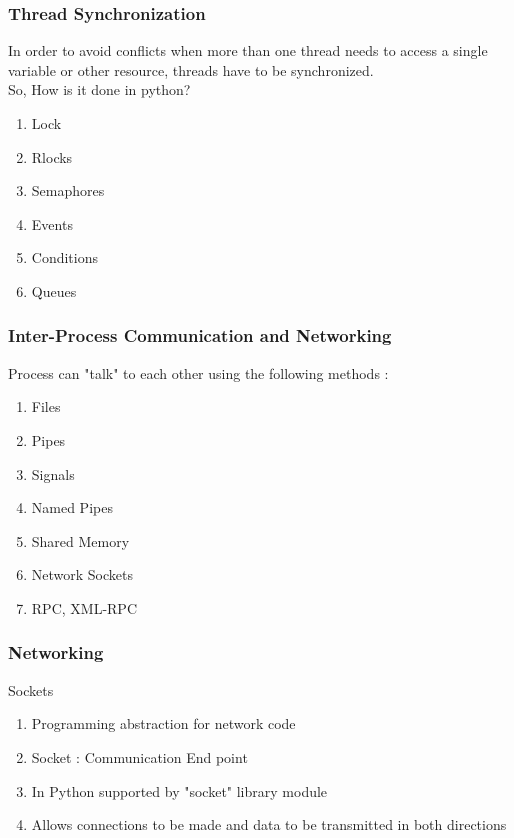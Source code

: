 \documentclass{beamer}
\begin{document}
\begin{frame}[fragile]
\frametitle{Thread Synchronization}

In order to avoid conflicts when more than one thread needs to access a single variable or other resource, threads have to be synchronized. \\
 
So, How is it done in python? \\
\begin{enumerate}
 \item Lock
 \item Rlocks
 \item Semaphores
 \item Events
 \item Conditions
 \item Queues
\end{enumerate}
\end{frame}


\begin{frame}[fragile]
\frametitle{Inter-Process Communication and Networking}
{Process can "talk" to each other using the following methods :}
\begin{enumerate}
 \item Files
 \item Pipes
 \item Signals
 \item Named Pipes
 \item Shared Memory
 \item Network Sockets
 \item RPC, XML-RPC
\end{enumerate}

\end{frame}

\begin{frame}[fragile]
\frametitle{ Networking}
{Sockets}
\begin{enumerate}
 \item Programming abstraction for network code
 \item Socket : Communication End point 
 \item In Python supported by "socket" library module
 \item Allows connections to be made and data to be transmitted in both directions
\end{enumerate}
\end{frame}
\end{document}
